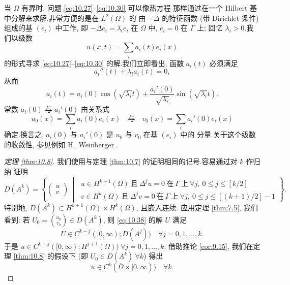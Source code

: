 \begin{remark}
\label{rem:10.9}
当 $\Omega$ 有界时, 问题 \eqref{eq:10.27}--\eqref{eq:10.30} 可以像热方程
那样通过在一个 Hilbert 基中分解来求解.非常方便的是在 $L^2(\Omega)$ 的
由 $-\Delta$ 的特征函数 (带 Dirichlet 条件) 组成的基 $(e_i)$ 中工作, 即
$-\Delta e_i=\lambda_ie_i$ 在 $\Omega$ 中, $e_i=0$ 在 $\Gamma$ 上; 回忆
$\lambda_i>0$.我们以级数
\begin{equation}
u(x,t)=\sum_ia_i(t)e_i(x)
\label{eq:10.41}
\end{equation}
的形式寻求 \eqref{eq:10.27}--\eqref{eq:10.30} 的解.我们立即看出, 函数
$a_i(t)$ 必须满足
\begin{equation*}
a_i''(t)+\lambda_ia_i(t)=0,
\end{equation*}
从而
\begin{equation*}
a_i(t)=a_i(0)\cos(\sqrt{\lambda_i}t)
+\frac{a_i'(0)}{\sqrt{\lambda_i}}\sin(\sqrt{\lambda_i}t).
\end{equation*}
常数 $a_i(0)$ 与 $a_i'(0)$ 由关系式
\begin{equation*}
u_0(x)=\sum_ia_i(0)e_i(x)
\quad\text{与}\quad
v_0(x)=\sum_ia_i'(0)e_i(x)
\end{equation*}
确定.换言之, $a_i(0)$ 与 $a_i'(0)$ 是 $u_0$ 与 $v_0$ 在基 $(e_i)$ 中的
分量.关于这个级数的收敛性, 参见例如 H.~Weinberger .
\end{remark}

\begin{proof}[定理 \ref{thm:10.8}]
我们使用与定理  \ref{thm:10.7} 的证明相同的记号.容易通过对 $k$ 作归纳
证明
\begin{equation*}
D(A^k)=\left\{\begin{pmatrix}u\\v\end{pmatrix}\ \middle|\
\begin{array}{l}
u\in H^{k+1}(\Omega)\ \text{且}\ \Delta^ju=0\ \text{在}\ \Gamma\ \text{上}
\ \forall j,\ 0\le j\le[k/2]\\[1mm]
v\in H^k(\Omega)\ \text{且}\ \Delta^jv=0\ \text{在}\ \Gamma\ \text{上}
\ \forall j,\ 0\le j\le[(k+1)/2]-1
\end{array}
\right\}.
\end{equation*}
特别地, $D(A^k)\subset H^{k+1}(\Omega)\times H^k(\Omega)$, 且嵌入连续.
应用定理  \ref{thm:7.5}, 我们看到: 若
$U_0=\binom{u_0}{v_0}\in D(A^k)$, 则 \eqref{eq:10.38} 的解 $U$ 满足
\begin{equation*}
U\in C^{k-j}([0,\infty);D(A^j))\quad\forall j=0,1,\dots,k.
\end{equation*}
于是 $u\in C^{k-j}([0,\infty);H^{j+1}(\Omega))\ \forall j=0,1,\dots,k$.
借助推论  \ref{cor:9.15}, 我们在定理  \ref{thm:10.8} 的假设下 (即
$U_0\in D(A^k)\ \forall k$) 得出
\begin{equation*}
u\in C^k(\overline\Omega\times[0,\infty))\quad\forall k.
\end{equation*}
\end{proof}

